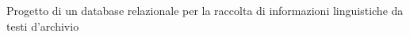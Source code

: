 \documentclass[twoside,styleplain,11pt,filologia,it,article]{spinoza}
\def\titolo{Progetto di un database relazionale per la raccolta di informazioni linguistiche da testi d'archivio}
\begin{document}
\titolo

\tableofcontents


\end{document}

